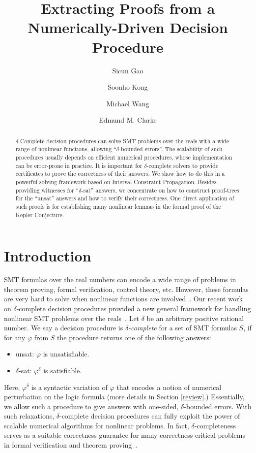 \documentclass[envcountsect]{llncs}
\title{Extracting Proofs from a Numerically-Driven Decision Procedure}
\author{Sicun Gao \and Soonho Kong \and Michael Wang \and Edmund M. Clarke}
\institute{Carnegie Mellon University, Pittsburgh, PA 15213}
\begin{document}
\maketitle

\begin{abstract}
$\delta$-Complete decision procedures can solve SMT problems over the
reals with a wide range of nonlinear functions, allowing ``$\delta$-bounded
errors''. The scalability of such procedures usually depends on efficient
numerical procedures, whose implementation can be error-prone in practice.
It is important for $\delta$-complete solvers to provide certificates to prove
the correctness of their answers.
We show how to do this in a powerful solving framework based
on Interval Constraint Propagation. Besides providing witnesses for ``$\delta$-sat''
answers, we concentrate on how to construct proof-trees for the ``unsat''
answers and how to verify their correctness. One direct application of such proofs
is for establishing many nonlinear lemmas in the formal proof of the Kepler Conjecture.
\end{abstract}

\section{Introduction}

SMT formulas over the real numbers can encode a wide range of problems in
theorem proving, formal verification, control theory, etc. However, these
formulas are very hard to solve when nonlinear functions are involved~\cite{}.
Our recent work on {$\delta$-complete decision procedures}
provided a new general framework for handling nonlinear SMT problems over the
reals~\cite{}. Let $\delta$ be an arbitrary positive rational number. We say a decision
procedure is {\em $\delta$-complete} for a set of SMT formulas $S$, if for any
$\varphi$ from $S$ the procedure returns
one of the following answers:
\begin{itemize}
 \item {\sf unsat}: $\varphi$ is unsatisfiable.
 \item {\sf $\delta$-sat}: $\varphi^{\delta}$ is satisfiable.
\end{itemize}
Here, $\varphi^{\delta}$ is a syntactic variation of $\varphi$ that encodes a
notion of numerical perturbation on the logic formula (more
details in Section \ref{review}.) Essentially, we allow such a procedure to
give answers with one-sided, $\delta$-bounded errors. With such relaxations,
$\delta$-complete decision procedures can fully exploit the
power of scalable numerical algorithms for nonlinear
problems. In fact, $\delta$-completeness serves as a suitable correctness
guarantee for many correctness-critical problems in formal
verification and theorem proving~\cite{}.
\end{document}
